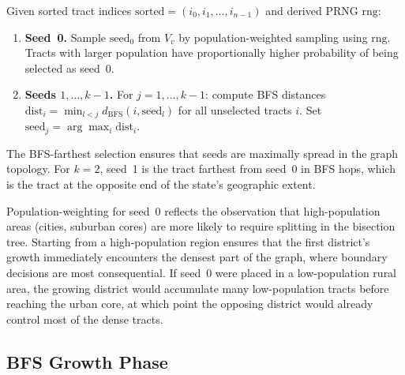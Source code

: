\begin{definition}
\label{def:seeds}
Given sorted tract indices $\mathrm{sorted} = (i_0, i_1, \ldots, i_{n-1})$
and derived PRNG $\mathrm{rng}$:
\begin{enumerate}
\item \textbf{Seed~0.} Sample $\mathrm{seed}_0$ from $V_v$ by
  population-weighted sampling using $\mathrm{rng}$.
  Tracts with larger population have proportionally higher probability
  of being selected as seed~0.

\item \textbf{Seeds $1, \ldots, k-1$.} For $j = 1, \ldots, k-1$:
  compute BFS distances $\mathrm{dist}_i = \min_{l < j} d_{\mathrm{BFS}}(i, \mathrm{seed}_l)$
  for all unselected tracts $i$.
  Set $\mathrm{seed}_j = \arg\max_i \mathrm{dist}_i$.
\end{enumerate}
\end{definition}

The BFS-farthest selection ensures that seeds are maximally spread in
the graph topology.
For $k = 2$, seed~1 is the tract farthest from seed~0 in BFS hops,
which is the tract at the opposite end of the state's geographic extent.

\begin{remark}
Population-weighting for seed~0 reflects the observation that
high-population areas (cities, suburban cores) are more likely to
require splitting in the bisection tree.
Starting from a high-population region ensures that the first district's
growth immediately encounters the densest part of the graph, where
boundary decisions are most consequential.
If seed~0 were placed in a low-population rural area, the growing district
would accumulate many low-population tracts before reaching the urban
core, at which point the opposing district would already control most of
the dense tracts.
\end{remark}

\subsection{BFS Growth Phase}

